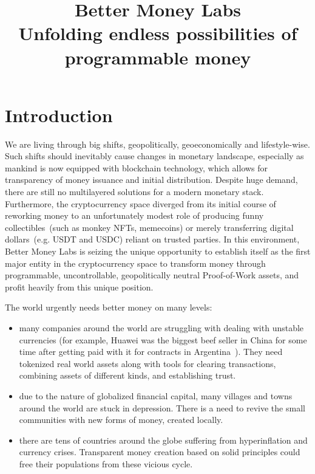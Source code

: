 \documentclass{llncs}   %
\begin{document}
\title{Better Money Labs\\ \small Unfolding endless possibilities of programmable money}

\author{}%

\maketitle

\section{Introduction}

We are living through big shifts, geopolitically, geoeconomically and lifestyle-wise. 
Such shifts should inevitably cause changes in monetary landscape, especially as mankind is now equipped with blockchain technology, which allows for transparency of money issuance and initial distribution.
Despite huge demand, there are still no multilayered solutions for a modern monetary stack. Furthermore, the cryptocurrency space diverged from its initial course of reworking money to an unfortunately modest role of producing funny collectibles~(such as monkey NFTs, memecoins) or merely transferring digital dollars~(e.g. USDT and USDC) reliant on trusted parties.
In this environment, Better Money Labs is seizing the unique opportunity to establish itself as the first major entity in the cryptocurrency space to transform money through programmable, uncontrollable, geopolitically neutral Proof-of-Work assets, and profit heavily from this unique position.

The world urgently needs better money on many levels:
\begin{itemize}
  \item many companies around the world are struggling with dealing with unstable currencies (for example, Huawei was the biggest beef seller in China for some time after getting paid with it for contracts in Argentina~\cite{huawei}). They need tokenized real world assets along with tools for clearing transactions, combining assets of different kinds, and establishing trust.
  \item due to the nature of globalized financial capital, many villages and towns around the world are stuck in depression. There is a need to revive the small communities with new forms of money, created locally.
  \item there are tens of countries around the globe suffering from hyperinflation and currency crises. Transparent money creation based on solid principles could free their populations from these vicious cycle.
\end{itemize}
\end{document}
